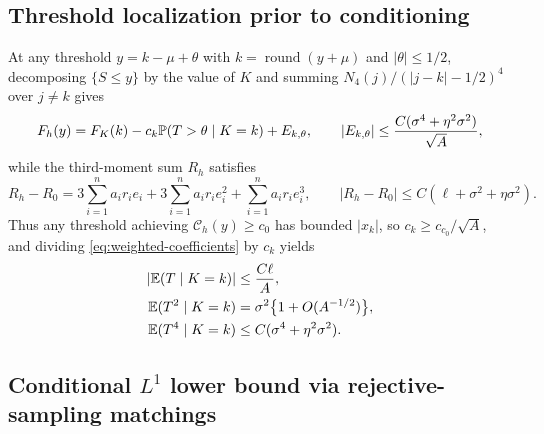 \subsection{Threshold localization prior to conditioning}

At any threshold $y=k-\mu+\theta$ with $k=\operatorname{round}(y+\mu)$ and
$|\theta|\le1/2$, decomposing $\{S\le y\}$ by the value of $K$ and summing
$N_4(j)/(|j-k|-1/2)^4$ over $j\ne k$ gives
\begin{equation}\label{eq:crossing-decomposition}
 F_h(y)=F_K(k)-c_k\mathbb P(T>\theta\mid K=k)+E_{k,\theta},
 \qquad |E_{k,\theta}|\le
             \frac{C(\sigma^4+\eta^2\sigma^2)}{\sqrt A},
\end{equation}
while the third-moment sum $R_h$ satisfies
\begin{equation}\label{eq:resource-change}
 R_h-R_0=3\sum_{i=1}^n a_i r_i e_i+3\sum_{i=1}^n a_i r_i e_i^2
                                     +\sum_{i=1}^n a_i r_i e_i^3,
 \qquad |R_h-R_0|\le C(\ell+\sigma^2+\eta\sigma^2).
\end{equation}
Thus any threshold achieving $\mathcal C_h(y)\ge c_0$ has bounded $|x_k|$,
so $c_k\ge c_{c_0}/\sqrt A$, and dividing \eqref{eq:weighted-coefficients}
by $c_k$ yields
\begin{align}
 |\mathbb E(T\mid K=k)|&\le \frac{C\ell}{A},\notag\\
 \mathbb E(T^2\mid K=k)&=\sigma^2\bigl\{1+O(A^{-1/2})\bigr\},\notag\\
 \mathbb E(T^4\mid K=k)&\le C(\sigma^4+\eta^2\sigma^2).
                                                    \label{eq:conditional-bulk}
\end{align}

\subsection{Conditional $L^1$ lower bound via rejective-sampling matchings}

